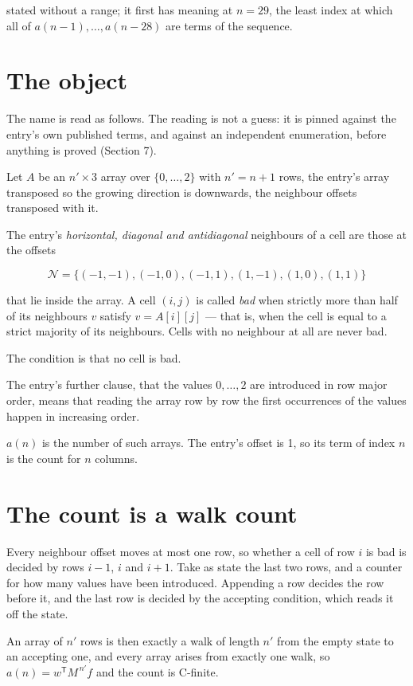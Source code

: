 \documentclass[11pt]{article}
\theoremstyle{definition}
\begin{document}
stated without a range; it first has meaning at $n = 29$, the least index at which all of $a(n-1),\dots,a(n-28)$ are terms of the sequence.

\section{The object}

The name is read as follows. The reading is not a guess: it is pinned against the entry's own published terms, and against an independent enumeration, before anything is proved (Section 7).

Let $A$ be an $n' \times 3$ array over $\{0,\dots,2\}$ with $n' = n + 1$ rows, the entry's array transposed so the growing direction is downwards, the neighbour offsets transposed with it.

The entry's {\itshape horizontal, diagonal and antidiagonal} neighbours of a cell are those at the offsets

\[\mathcal{N} = \{(-1,-1), (-1,0), (-1,1), (1,-1), (1,0), (1,1)\}\]

that lie inside the array. A cell $(i,j)$ is called {\itshape bad} when strictly more than half of its neighbours $v$ satisfy $v = A[i][j]$ --- that is, when the cell is equal to a strict majority of its neighbours. Cells with no neighbour at all are never bad.

The condition is that no cell is bad.

The entry's further clause, that the values $0,\dots,2$ are introduced in row major order, means that reading the array row by row the first occurrences of the values happen in increasing order.

$a(n)$ is the number of such arrays. The entry's offset is 1, so its term of index $n$ is the count for $n$ columns.

\section{The count is a walk count}

Every neighbour offset moves at most one row, so whether a cell of row $i$ is bad is decided by rows $i-1$, $i$ and $i+1$. Take as state the last two rows, and a counter for how many values have been introduced. Appending a row decides the row before it, and the last row is decided by the accepting condition, which reads it off the state.

An array of $n'$ rows is then exactly a walk of length $n'$ from the empty state to an accepting one, and every array arises from exactly one walk, so $a(n) = w^{\mathsf T}M^{\,n'}f$ and the count is C-finite.
\end{document}

